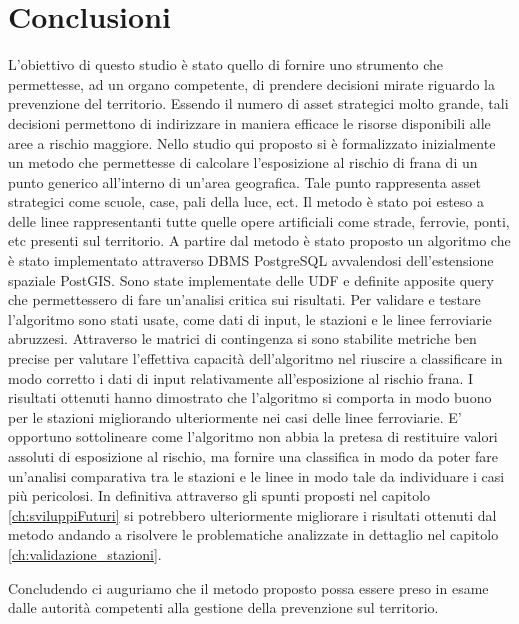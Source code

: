 
\chapter{Conclusioni} 
L'obiettivo di questo studio è stato quello di fornire uno strumento che permettesse, ad un organo competente, di prendere decisioni mirate riguardo la prevenzione del territorio.
Essendo il numero di asset strategici molto grande, tali decisioni permettono di indirizzare in maniera efficace le risorse disponibili alle aree a rischio maggiore. Nello studio qui proposto si è formalizzato inizialmente un metodo che permettesse di calcolare l'esposizione al rischio di frana di un punto generico all'interno di un'area geografica. Tale punto rappresenta asset strategici come scuole, case, pali della luce, ect. Il metodo è stato poi esteso a delle linee rappresentanti tutte quelle opere artificiali come strade, ferrovie, ponti, etc presenti sul territorio. A partire dal metodo è stato proposto un algoritmo che è stato implementato attraverso DBMS PostgreSQL avvalendosi dell’estensione spaziale PostGIS. Sono state implementate delle UDF e definite apposite query che permettessero di fare un'analisi critica sui risultati. Per validare e testare l'algoritmo sono stati usate, come dati di input, le stazioni e le linee ferroviarie abruzzesi. Attraverso le matrici di contingenza si sono stabilite metriche ben precise per valutare l'effettiva capacità dell'algoritmo nel riuscire a classificare in modo corretto i dati di input relativamente all'esposizione al rischio frana. I risultati ottenuti hanno dimostrato che l'algoritmo si comporta in modo buono per le stazioni migliorando ulteriormente nei casi delle linee ferroviarie. E' opportuno sottolineare come l'algoritmo non abbia la pretesa di restituire valori assoluti di esposizione al rischio, ma fornire una classifica in modo da poter fare un'analisi comparativa tra le stazioni e le linee in modo tale da individuare i casi più pericolosi. In definitiva attraverso gli spunti proposti nel capitolo \ref{ch:sviluppiFuturi} si potrebbero ulteriormente migliorare i risultati ottenuti dal metodo andando a risolvere le problematiche analizzate in dettaglio nel capitolo \ref{ch:validazione_stazioni}.

Concludendo ci auguriamo che il metodo proposto possa essere preso in esame dalle autorità competenti alla gestione della prevenzione sul territorio.
